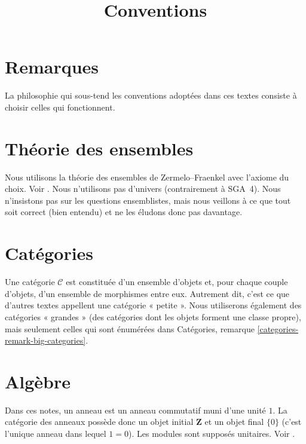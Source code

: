 

%


\title{Conventions}


\maketitle

\label{section-phantom}

\tableofcontents

\section{Remarques}
\label{section-comments}

\noindent
La philosophie qui sous-tend les conventions adoptées dans ces textes consiste
à choisir celles qui fonctionnent.

\section{Théorie des ensembles}
\label{section-sets}

\noindent
Nous utilisons la théorie des ensembles de Zermelo--Fraenkel avec l'axiome du
choix. Voir \cite{Kunen}. Nous n'utilisons pas d'univers (contrairement à
SGA~4). Nous n'insistons pas sur les questions ensemblistes, mais nous veillons
à ce que tout soit correct (bien entendu) et ne les éludons donc pas davantage.


\section{Catégories}
\label{section-categories}

\noindent
Une catégorie $\mathcal{C}$ est constituée d'un ensemble d'objets et, pour
chaque couple d'objets, d'un ensemble de morphismes entre eux. Autrement dit,
c'est ce que d'autres textes appellent une catégorie « petite ». Nous
utiliserons également des catégories « grandes » (des catégories dont les
objets forment une classe propre), mais seulement celles qui sont énumérées
dans Catégories, remarque \ref{categories-remark-big-categories}.

\section{Algèbre}
\label{section-algebra}

\noindent
Dans ces notes, un anneau est un anneau commutatif muni d'une unité $1$. La catégorie des
anneaux possède donc un objet initial $\mathbf{Z}$ et un objet final $\{0\}$
(c'est l'unique anneau dans lequel $1 = 0$). Les modules sont supposés
unitaires. Voir \cite{Eisenbud}.

